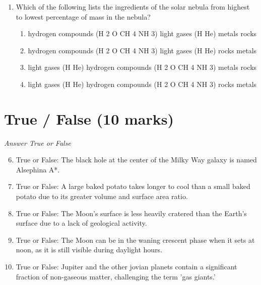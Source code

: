 \documentclass[12pt]{article}
\begin{document}
\begin{enumerate}[label=\arabic*.]
\begin{enumerate}[label=(\alph*)]
    \item fast rotation only
    \item a rocky mantle only
    \item a molten metallic core only
    \item both a molten metallic core and reasonably fast rotation
\end{enumerate}
\item Which of the following lists the ingredients of the solar nebula from highest to lowest percentage of mass in the nebula?
\begin{enumerate}[label=(\alph*)]
    \item hydrogen compounds (H 2 O CH 4 NH 3) light gases (H He) metals rocks
    \item hydrogen compounds (H 2 O CH 4 NH 3) light gases (H He) rocks metals
    \item light gases (H He) hydrogen compounds (H 2 O CH 4 NH 3) metals rocks
    \item light gases (H He) hydrogen compounds (H 2 O CH 4 NH 3) rocks metals
\end{enumerate}
\end{enumerate}

\section*{True / False (10 marks)}
\textit{Answer True or False}
\begin{enumerate}[label=\arabic*.]
\setcounter{enumi}{5}
\item True or False: The black hole at the center of the Milky Way galaxy is named Alsephina A*.
\item True or False: A large baked potato takes longer to cool than a small baked potato due to its greater volume and surface area ratio.
\item True or False: The Moon's surface is less heavily cratered than the Earth's surface due to a lack of geological activity.
\item True or False: The Moon can be in the waning crescent phase when it sets at noon, as it is still visible during daylight hours.
\item True or False: Jupiter and the other jovian planets contain a significant fraction of non-gaseous matter, challenging the term 'gas giants.'
\end{enumerate}
\end{document}
